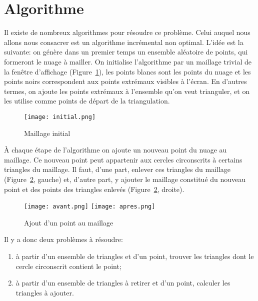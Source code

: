 \documentclass{../../../LaTeX/tdsimple}
\begin{document}

\section{Algorithme}

Il existe de nombreux algorithmes pour résoudre ce problème.  Celui
auquel nous allons nous consacrer est un algorithme incrémental non
optimal.  L'idée est la suivante: on génère dans un premier temps un
ensemble aléatoire de points, qui formeront le nuage à mailler.  On
initialise l'algorithme par un maillage trivial de la fenêtre
d'affichage (Figure~\ref{fig:maillageinit}), les points blancs sont
les points du nuage et les points noirs correspondent aux points
extrémaux visibles à l'écran. En d'autres termes, on ajoute les points
extrémaux à l'ensemble qu'on veut trianguler, et on les utilise comme
points de départ de la triangulation.

\begin{figure}
  \centering
  \texttt{[image: initial.png]}
  \caption{Maillage initial}
  \label{fig:maillageinit}
\end{figure}

À chaque étape de l'algorithme on ajoute un nouveau point du nuage au
maillage.  Ce nouveau point peut appartenir aux cercles circonscrits à
certains triangles du maillage.  Il faut, d'une part, enlever ces
triangles du maillage (Figure~\ref{fig:ajoutpoint}, gauche) et,
d'autre part, y ajouter le maillage constitué du nouveau point et des
points des triangles enlevés (Figure~\ref{fig:ajoutpoint}, droite).

\begin{figure}
  \centering
  \texttt{[image: avant.png]}
  \hfill
  \texttt{[image: apres.png]}
  \caption{Ajout d'un point au maillage}
\label{fig:ajoutpoint}
\end{figure}

Il y a donc deux problèmes à résoudre:
\begin{enumerate}
\item à partir d'un ensemble de triangles et d'un point, trouver les
  triangles dont le cercle circonscrit contient le point;
\item à partir d'un ensemble de triangles à retirer et d'un point,
  calculer les triangles à ajouter.
\end{enumerate}
\end{document}
